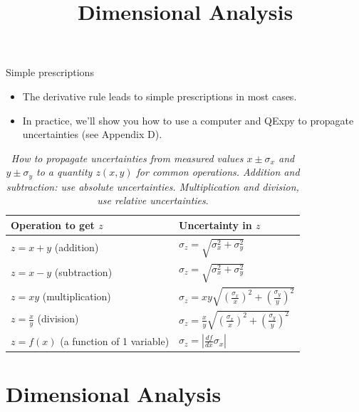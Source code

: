 \documentclass[aspectratio=169,
hyperref={colorlinks,urlcolor=blue}
]{beamer}
\begin{document}
\begin{frame}{Simple prescriptions}
\begin{itemize}
\item The derivative rule leads to simple prescriptions in most cases.
\item In practice, we’ll show you how to use a computer and QExpy to propagate uncertainties (see Appendix D).
\end{itemize}
\scriptsize
\begin{table}[H]
\centering
\begin{tabular}{p{2.5in}p{2in}} 
\textbf{Operation to get $z$} &\textbf{Uncertainty in $z$} \\
\hline
\hline
$z=x+y$ (addition) &  $\sigma_z=\sqrt{\sigma_x^2+\sigma_y^2}$ \\ \hline
$z=x-y$ (subtraction) & $\sigma_z=\sqrt{\sigma_x^2+\sigma_y^2}$ \\ \hline
$z=xy$ (multiplication) & $\sigma_z=xy\sqrt{\left(\frac{\sigma_x}{x}\right)^2+\left(\frac{\sigma_y}{y}\right)^2}$ \\ \hline
$z=\frac{x}{y}$ (division) & $\sigma_z=\frac{x}{y}\sqrt{\left(\frac{\sigma_x}{x}\right)^2+\left(\frac{\sigma_y}{y}\right)^2}$ \\ \hline
$z=f(x)$ (a function of 1 variable) &$\sigma_z=\left|\frac{df}{dx}\sigma_x \right|$ \\ \hline
\end{tabular}
\caption*{\label{tab:modelandexperiment:prop_uncertainties}\textit{How to propagate uncertainties from measured values $x\pm\sigma_x$ and $y\pm\sigma_y$ to a quantity $z(x,y)$ for common operations. Addition and subtraction: use absolute uncertainties. Multiplication and division, use relative uncertainties}.}
\end{table}
\end{frame}









\section{Dimensional Analysis}
\label{sec:dimensionalanalysis}
\title{Dimensional Analysis}
\author{\insertsubsection}


\begin{frame}
\titlepage
\thispagestyle{empty}
\end{frame}
\end{document}
